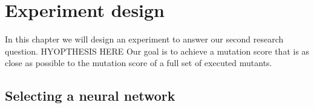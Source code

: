 \documentclass[../main]{subfiles}
\begin{document}
\clearpage
\section{Experiment design}
In this chapter we will design an experiment to answer our second research question.
HYOPTHESIS HERE
Our goal is to achieve a mutation score that is as close as possible to the mutation score of a full set of executed mutants.
\newline
{}

\subsection{Selecting a neural network}
\end{document}
